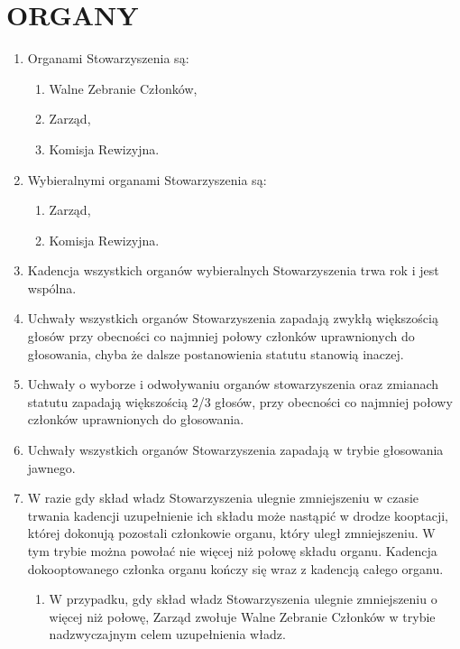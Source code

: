 \documentclass{article}
\begin{document}
\section{ORGANY}
  \begin{enumerate}
    \item Organami Stowarzyszenia są:
      \begin{enumerate}
        \item Walne Zebranie Członków,
        \item Zarząd,
        \item Komisja Rewizyjna.
      \end{enumerate}
    \item Wybieralnymi organami Stowarzyszenia są:
      \begin{enumerate}
        \item Zarząd,
        \item Komisja Rewizyjna.
      \end{enumerate}
    \item Kadencja wszystkich organów wybieralnych Stowarzyszenia trwa rok i jest wspólna.
    \item Uchwały wszystkich organów Stowarzyszenia zapadają zwykłą większością głosów przy obecności co najmniej połowy członków uprawnionych do głosowania, chyba że dalsze postanowienia statutu stanowią inaczej.
    \item Uchwały o wyborze i odwoływaniu organów stowarzyszenia oraz zmianach statutu zapadają większością 2/3 głosów, przy obecności co najmniej połowy członków uprawnionych do głosowania.
    \item Uchwały wszystkich organów Stowarzyszenia zapadają w trybie głosowania jawnego.
    \item W razie gdy skład władz Stowarzyszenia ulegnie zmniejszeniu w czasie trwania kadencji uzupełnienie ich składu może nastąpić w drodze kooptacji, której dokonują pozostali członkowie organu, który uległ zmniejszeniu. W tym trybie można powołać nie więcej niż połowę składu organu. Kadencja dokooptowanego członka organu kończy się wraz z kadencją całego organu.
    \begin{enumerate}
    	\item W przypadku, gdy skład władz Stowarzyszenia ulegnie zmniejszeniu o więcej niż połowę, Zarząd zwołuje Walne Zebranie Członków w trybie nadzwyczajnym celem uzupełnienia władz.
    \end{enumerate}

\end{enumerate}
\end{document}

